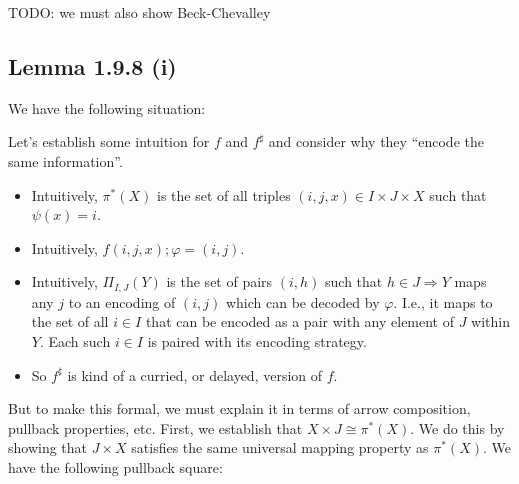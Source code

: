 \documentclass{article}
\begin{document}
\begin{center}
\end{center}

TODO: we must also show Beck-Chevalley

\subsection*{Lemma 1.9.8 (i)}

We have the following situation:

\begin{center}
\end{center}

Let's establish some intuition for $f$ and $f^\sharp$ and consider why they ``encode the same information''.

\begin{itemize}
\item Intuitively, $\pi^*(X)$ is the set of all triples $(i,j,x) \in I \times J \times X$ such that $\psi(x)=i$.
\item Intuitively, $f(i,j,x);\varphi = (i,j)$.
\item Intuitively, $\Pi_{I,J}(Y)$ is the set of pairs $(i,h)$ such that $h \in J \Rightarrow Y$ maps any $j$ to an 
      encoding of $(i,j)$ which can be decoded by $\varphi$. I.e., it maps to the set of all $i \in I$ that can be encoded
      as a pair with any element of $J$ within $Y$. Each such $i \in I$ is paired with its encoding strategy.
\item So $f^\sharp$ is kind of a curried, or delayed, version of $f$.
\end{itemize}
But to make this formal, we must explain it in terms of arrow composition, pullback properties, etc. 
First, we establish that $X \times J \cong \pi^*(X)$. We do this by showing that $J \times X$ satisfies the
same universal mapping property as $\pi^*(X)$. We have the following pullback square:
\end{document}
